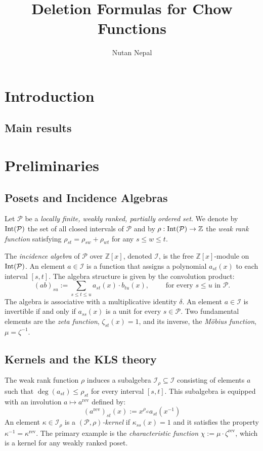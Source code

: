 \documentclass[11pt, letterpaper, english]{amsart}
\title[Deletion Formulas for Chow Functions]{Deletion Formulas for Chow Functions}
\author[N.~Nepal]{Nutan Nepal}
\theoremstyle{teoremas}
\theoremstyle{definition}
\newcommand{\rev}{\operatorname{rev}}
\newcommand{\calP}{\mathcal{P}}
\newcommand{\ZZ}{\mathbb{Z}}
\newcommand{\IntP}{\normalfont\text{Int}}
\begin{document}
\begin{abstract}

\end{abstract}

\maketitle

\section{Introduction}

\subsection{Main results}

\section{Preliminaries}

\subsection{Posets and Incidence Algebras}
Let \(\calP\) be a \emph{locally finite, weakly ranked, partially ordered set}.
We denote by \(\IntP(\calP)\) the set of all closed intervals of \(\calP\) and
by \(\rho: \IntP(\calP) \to \ZZ\)
the \emph{weak rank function} satisfying \(\rho_{st} = \rho_{sw} + \rho_{wt}\) for any \(s \le w \le t\).

The \emph{incidence algebra} of \(\calP\) over \(\ZZ[x]\), denoted \(\mathscr{I}\), is the free \(\ZZ[x]\)-module on \(\IntP(\calP)\). An element \(a \in \mathscr{I}\) is a function that assigns a polynomial \(a_{st}(x)\) to each interval \([s,t]\). The algebra structure is given by the convolution product:
\[ (ab)_{su} := \sum_{s\leq t\leq u} a_{st}(x) \cdot b_{tu}(x), \qquad
    \text{ for every \(s\leq u\) in \(\calP\).}
\] The algebra is associative with a multiplicative identity \(\delta\).
An element \(a \in \mathscr{I}\) is invertible if and only if \(a_{ss}(x)\) is a unit
for every \(s \in \calP\). Two fundamental elements are the \emph{zeta function},
\(\zeta_{st}(x) = 1\), and its inverse, the \emph{Möbius function}, \(\mu = \zeta^{-1}\).

\subsection{Kernels and the KLS theory}
The weak rank function \(\rho\) induces a subalgebra \(\mathscr{I}_\rho \subseteq \mathscr{I}\) consisting of elements \(a\) such that \(\deg(a_{st}) \le \rho_{st}\) for every interval \([s,t]\). This subalgebra is equipped with an involution \(a \mapsto a^{\rev}\) defined by:
\[ (a^{\rev})_{st}(x) := x^{\rho_{st}} a_{st}(x^{-1}) \]
An element \(\kappa \in \mathscr{I}_\rho\) is a \emph{\((\calP,\rho)\)-kernel} if
\(\kappa_{ss}(x) = 1\) and it satisfies the property \(\kappa^{-1} = \kappa^{\rev}\).
The primary example is the \emph{characteristic function} \(\chi := \mu \cdot \zeta^{\rev}\),
which is a kernel for any weakly ranked poset.
\end{document}
